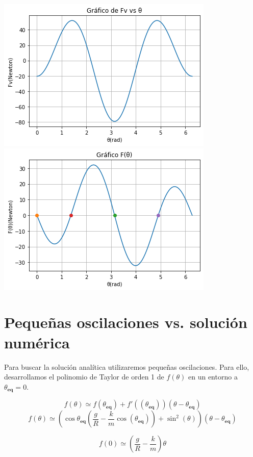 \documentclass{article}
\begin{document}
	\begin{center}
		\includegraphics[scale=0.5]{01.png}
		\includegraphics[scale=0.5]{02.png}
	\end{center}

	\section{Pequeñas oscilaciones vs. soluci\'on num\'erica}
	
	Para buscar la soluci\'on anal\'itica utilizaremos pequeñas oscilaciones. Para ello, desarrollamos el polinomio de Taylor de orden 1 de $f(\theta)$ en un entorno a $\theta_{\textbf{eq}} = 0$.
	
	$$
		f(\theta) \simeq f(\theta_{\textbf{eq}}) + f'((\theta_{\textbf{eq}}))(\theta - \theta_{\textbf{eq}})
	$$
	\begin{equation}
	\label{eqn:taylor}
		f(\theta) \simeq \left(\cos{\theta_{\textbf{eq}}}\left(\frac{g}{R} - \frac{k}{m}\cos(\theta_{\textbf{eq}})\right) + \sin^2{(\theta)}\right)(\theta - \theta_{\textbf{eq}})
	\end{equation}
	
	$$f(0) \simeq \left(\frac{g}{R} - \frac{k}{m}\right)\theta$$
	
\end{document}
